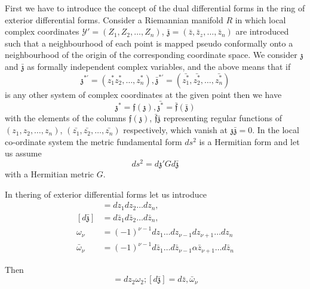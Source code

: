 First we have to introduce the concept of the dual differential forms
in the ring of exterior differential forms. Consider a Riemannian
manifold $R$ in which local complex coordinates $\mathscr{Y'} = (Z_1,
Z_2, \ldots, Z_n)$, $ \bar {\mathfrak{z}} = (\bar{z}, \bar{z}_z,
\ldots, \bar{z}_n) $ are introduced such that a neighbourhood of each
point is mapped pseudo conformally onto a neighbourhood of the origin
of the corresponding coordinate space. We consider $\mathfrak{z}$ and
$\bar{\mathfrak{z}}$  as formally independent complex variables, and
the above means that if  
$$
\mathfrak{z}^{*'} = (z^*_1 z^*_2,\ldots, z^*_n),
\bar{\mathfrak{z}}^{*'} = (\bar{z^*_1}, \bar{z^*_2},\ldots,
\bar{z^*_n}) 
$$
 is any other system of complex coordinates at the given point then we
 have  
 \begin{equation*}
\mathfrak{z}^{*} = \mathfrak{f}  (\mathfrak{z}), \bar{\mathfrak{z}^*} =
\bar{\mathfrak{f}} (\bar {\mathfrak{z}}) \tag{312}\label{eq312} 
 \end{equation*} 
 with the elements of the columns $\mathfrak{f} (\mathfrak{z})$,
 $\bar{\mathfrak{f}} \bar {\mathfrak{z}}$ representing regular functions
of $(z_1, z_2,\ldots, z_n)$, $(\bar{z_1}, \bar{z_2},\ldots, \bar{z_n})$
 respectively, which vanish at $\mathfrak{z} \bar{\mathfrak{z}} =
 0$. In the local co-ordinate system the metric fundamental form
 $ds^2$ is a Hermitian form and let us assume  
 \begin{equation*}
ds^2 = d \mathfrak{z}' G d \bar{\mathfrak{z}} \tag{313}\label{eq313}
 \end{equation*} 
 with a Hermitian metric $G$. 
 
 In the\pageoriginale ring of exterior differential forms let us
 introduce  
 \begin{align*}
[d \mathfrak{z}] & = d{z_1} d{z_2} \ldots d{z_n},\\ 
[d \bar{\mathfrak{z}}] & = d{\bar{z}_1} d{\bar{z}_2} \ldots
d{\bar{z}_n},\\ 
\omega_\nu  & = (-1)^{\nu - 1} dz_{1} \dots dz_{\nu - 1} 
dz_{\nu + 1} \ldots dz_n\\
\bar{\omega}_\nu & = (-1)^{\nu - 1} d\bar{z}_{1} \ldots d\bar{z}_{\nu
  - 1} \alpha \bar{z}_{\nu +1} \ldots d\bar{z}_n \tag{314}\label{eq314} 
 \end{align*} 
 
 Then 
 \begin{equation*}
[d \mathfrak{z}]   = dz_2 \omega_2; [ d\bar{\mathfrak{z}}] = d\bar{z},
\bar {\omega}_\nu \tag{315}\label{eq315} 
 \end{equation*} 
 
